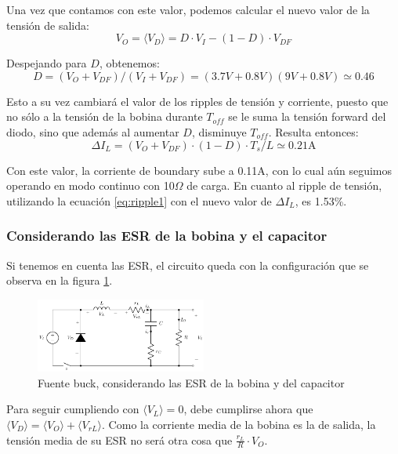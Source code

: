 \documentclass[e4_tp1_main.tex]{subfiles}
\begin{document}
Una vez que contamos con este valor, podemos calcular el nuevo valor de la tensi\'on de salida: 
\begin{equation}
	V_O = \langle V_D \rangle = D \cdot V_I - (1-D) \cdot V_{DF}   
\end{equation}

Despejando para $D$, obtenemos:
\begin{equation}
	D = (V_O + V_{DF})/(V_I + V_{DF}) 
	= (3.7V + 0.8V)(9V + 0.8V)
	\simeq 0.46 
\end{equation}

Esto a su vez cambiar\'a el valor de los ripples de tensi\'on y corriente, puesto que no s\'olo a la tensi\'on de la bobina durante $T_{off}$ se le suma la tensi\'on forward del diodo, sino que adem\'as al aumentar $D$, disminuye $T_{off}$. Resulta entonces: 
\begin{equation}
	\Delta I_L = (V_O + V_{DF}) \cdot (1-D) \cdot T_s / L
	\simeq 0.21\text{A}
\end{equation} 

Con este valor, la corriente de boundary sube a 0.11A, con lo cual a\'un seguimos operando en modo continuo con 10$\Omega$ de carga. En cuanto al ripple de tensi\'on, utilizando la ecuaci\'on \ref{eq:ripple1} con el nuevo valor de $\Delta I_L$, es 1.53\%.


\subsubsection{Considerando las ESR de la bobina y el capacitor}

Si tenemos en cuenta las ESR, el circuito queda con la configuraci\'on que se observa en la figura \ref{fig:buck-esrs}.

\begin{figure}
	\centering
	\includegraphics[width=0.5\textwidth]{images/ej2/buck_esrs.pdf}
	\caption{Fuente buck, considerando las ESR de la bobina y del capacitor}
	\label{fig:buck-esrs}
\end{figure}


Para seguir cumpliendo con $\langle V_L \rangle = 0$, debe cumplirse ahora que $\langle V_D \rangle = \langle V_O \rangle + \langle V_{rL} \rangle$. Como la corriente media de la bobina es la de salida, la tensi\'on media de su ESR no ser\'a otra cosa que $\frac{r_L}{R} \cdot V_O$. 
\end{document}

